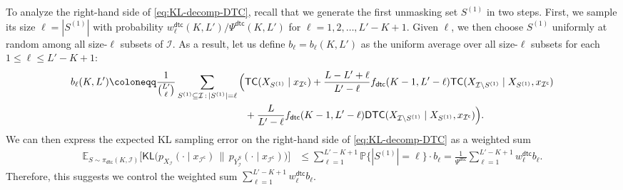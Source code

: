 \documentclass[english]{article}
\newcommand{\defn}{\coloneqq}
\newcommand{\cI}{\mathcal{I}}
\newcommand{\bE}{\mathbb{E}}
\newcommand{\bP}{\mathbb{P}}
\newcommand{\KL}{\mathsf{KL}}
\newcommand{\ol}{\overline}
\newcommand{\TC}{\mathsf{TC}}
\newcommand{\DTC}{\mathsf{DTC}}
\newcommand{\dtc}{\mathsf{dtc}}
\begin{document}
To analyze the right-hand side of \eqref{eq:KL-decomp-DTC}, recall that we generate the first unmasking set $S^{(1)}$ in two steps. First, we sample its size $\ell =  |S^{(1)}|$ with probability $w^\dtc_{\ell}(K,L') / \Psi^\dtc(K,L')$ for $\ell = 1, 2, \ldots, L'-K+1$. Given $\ell$, we then choose $S^{(1)}$ uniformly at random among all size-$ \ell $ subsets of $ \cI $. 
As a result, let us define $ b_\ell = b_\ell (K,L') $ as the uniform average over all size-$\ell$ subsets for each $1 \leq \ell \leq L'-K+1$:
\begin{align}
    b_{\ell}(K,L') \defn\frac{1}{\binom{L'}{\ell}}\sum_{S^{(1)} \subseteq \cI \,:\, |S^{(1)}|=\ell} \Big(&  \TC(X_{S^{(1)}} \mid x_{\cI^\mathsf{c}}) + \frac{L-L'+\ell}{L'-\ell}f_\dtc(K-1, L'-\ell)\TC(X_{\cI \setminus S^{(1)}} \mid X_{S^{(1)}}, x_{\cI^\mathsf{c}}) \notag \\
    & + \frac{L}{L'-\ell}f_\dtc(K-1, L'-\ell)\DTC(X_{\cI \setminus S^{(1)}} \mid X_{S^{(1)}}, x_{\cI^\mathsf{c}}) \Big). \label{eq:bl-DTC}
\end{align}
We can then express the expected KL sampling error on the right-hand side of \eqref{eq:KL-decomp-DTC} as a weighted sum
\begin{align}\label{eq:KL-decomp-DTC-2}
    \bE_{S \sim \pi_{\dtc}(K, \cI)} \Big[\KL\big(p_{X_{\cI}}(\cdot \mid x_{\cI^\mathsf{c}}) \,\|\, p_{\ol Y_{\cI}^S}(\cdot \mid x_{\cI^\mathsf{c}}) \big)\Big] &  \leq \sum_{\ell=1}^{L'-K+1} \bP\{|S^{(1)}|=\ell\} \cdot b_{\ell} = \frac{1}{\Psi^\dtc} \sum_{\ell=1}^{L'-K+1} w^\dtc_{\ell} b_{\ell}.
\end{align}
Therefore, this suggests we control the weighted sum $ \sum_{\ell=1}^{L'-K+1} w^\dtc_{\ell} b_{\ell} $.
\end{document}
